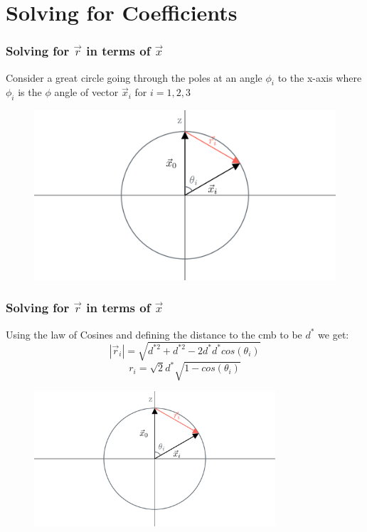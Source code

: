 \documentclass{beamer}
\begin{document}
    \section{Solving for Coefficients}

    \begin{frame}
        \frametitle{Solving for $\vec r$ in terms of $\vec x$}
        Consider a great circle going through the poles at an angle $\phi_i$ to the x-axis where
        $\phi_i$ is the $\phi$ angle of vector $\vec x_i$ for $i = 1,2,3$\\
        \begin{figure}
            \centering
                \includegraphics[width=1\textwidth]{media/angle_conversion_diagram_2_ManimCE_v0.17.3.png}
            \end{figure}
    \end{frame}

    \begin{frame}
        \frametitle{Solving for $\vec r$ in terms of $\vec x$}
        Using the law of Cosines and defining the distance to the cmb to be $d^*$ we get:\\
        \begin{equation*}
            |\vec r_i| = \sqrt{d^{*2} + d^{*2} - 2d^*d^*cos(\theta_i)}
        \end{equation*}
        \begin{equation*}
            \boxed{r_i = \sqrt{2}d^*\sqrt{1 - cos(\theta_i)}}
        \end{equation*}

        \begin{figure}
            \centering
                \includegraphics[width=0.8\textwidth]{media/angle_conversion_diagram_2_ManimCE_v0.17.3.png}
            \end{figure}
    \end{frame}
\end{document}
